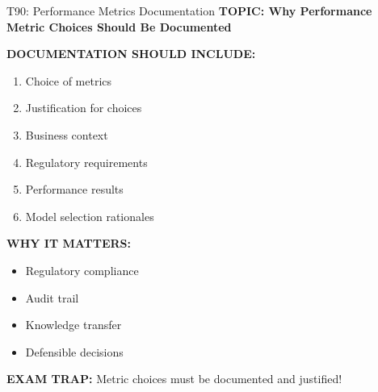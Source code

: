 \documentclass[8pt]{beamer}
\begin{document}
	\begin{frame}{T90: Performance Metrics Documentation}
		\fontsize{6.5}{7.5}\selectfont
		\textbf{TOPIC: Why Performance Metric Choices Should Be Documented}
		
		\vspace{0.1cm}
		\textbf{DOCUMENTATION SHOULD INCLUDE:}
		\begin{enumerate}
			\item Choice of metrics
			\item Justification for choices
			\item Business context
			\item Regulatory requirements
			\item Performance results
			\item Model selection rationales
		\end{enumerate}
		
		\vspace{0.1cm}
		\textbf{WHY IT MATTERS:}
		\begin{itemize}
			\item Regulatory compliance
			\item Audit trail
			\item Knowledge transfer
			\item Defensible decisions
		\end{itemize}
		
		\textcolor{myred}{\textbf{EXAM TRAP:}} Metric choices must be \textcolor{myblue}{documented and justified}!
	\end{frame}
	
\end{document}
